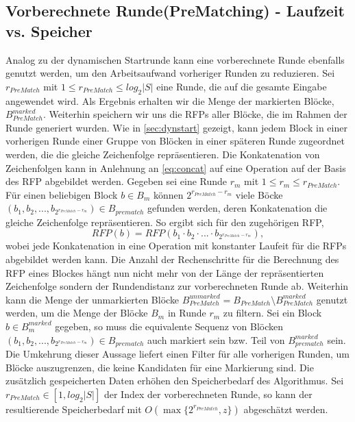 \subsection{Vorberechnete Runde(PreMatching) - Laufzeit vs. Speicher}
Analog zu der dynamischen Startrunde kann eine vorberechnete Runde ebenfalls genutzt werden, um den Arbeitsaufwand vorheriger Runden zu reduzieren. Sei $r_{PreMatch}$ mit 
$1\leq r_{PreMatch} \leq log_2{|S|}$ eine Runde, die auf die gesamte Eingabe angewendet wird. Als Ergebnis erhalten wir die Menge der markierten Blöcke, $B_{PreMatch}^{marked}$.
Weiterhin speichern wir uns die RFPs aller Blöcke, die im Rahmen der Runde generiert wurden. Wie in \ref{sec:dynstart} gezeigt, kann jedem Block in einer vorherigen Runde einer Gruppe
von Blöcken in einer späteren Runde zugeordnet werden, die die gleiche Zeichenfolge repräsentieren. Die Konkatenation von Zeichenfolgen kann in Anlehnung an \ref{eq:concat} auf eine
Operation auf der Basis des RFP abgebildet werden. Gegeben sei eine Runde $r_m$ mit $1\leq r_m \leq r_{PreMatch}$. Für einen beliebigen Block $b \in B_m$ können 
$2^{r_{PreMatch}-r_m}$ viele Böcke $(b_1, b_2, ..., b_{2^{r_{PreMatch}-r_m}})\in B_{prematch}$ gefunden werden, deren Konkatenation die gleiche Zeichenfolge repräsentieren. So ergibt sich 
für den zugehörigen RFP,
\begin{equation}
    RFP(b) = RFP(b_1 \cdot b_2 \cdot ... \cdot b_{2^{r_{PreMatch}-r_m}}),
\end{equation}
wobei jede Konkatenation in eine Operation mit konstanter Laufeit für die RFPs abgebildet werden kann. Die Anzahl der Rechenschritte für die Berechnung des RFP eines Blockes hängt nun 
nicht mehr von der Länge der repräsentierten Zeichenfolge sondern der Rundendistanz zur vorberechneten Runde ab.
Weiterhin kann die Menge der unmarkierten Blöcke $B_{PreMatch}^{unmarked}=B_{PreMatch}\setminus B_{PreMatch}^{marked}$ genutzt werden, um die Menge der Blöcke $B_m$ in Runde $r_m$
zu filtern. Sei ein Block $b \in B_m^{marked}$ gegeben, so muss die equivalente Sequenz von Blöcken $(b_1, b_2, ..., b_{2^{r_{PreMatch}-r_m}})\in B_{prematch}$ auch markiert sein bzw.
Teil von $B_{prematch}^{marked}$ sein.
Die Umkehrung dieser Aussage liefert einen Filter für alle vorherigen Runden, um Blöcke auszugrenzen, die keine Kandidaten für eine Markierung sind. Die zusätzlich gespeicherten Daten 
erhöhen den Speicherbedarf des Algorithmus. 
Sei $r_{PreMatch}\in [1, log_2{|S|}]$ der Index der vorberechneten Runde, so kann der resultierende Speicherbedarf mit $O(\max\{2^{r_{PreMatch}}, z\})$ abgeschätzt werden.

